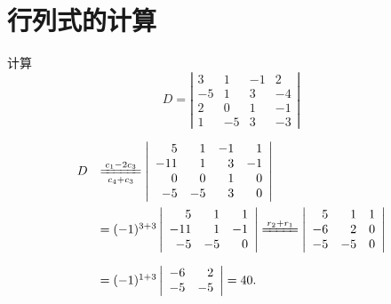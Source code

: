 \section{行列式的计算}
\begin{frame}

\begin{testexample}
  计算
  $$
  D = \left|
    \begin{array}{rrrr}
      3   &  1  &  -1  &  2 \\
      -5  &  1  &   3  & -4 \\
      2   &  0  &   1  & -1 \\
      1   & -5  &   3  &  -3 
    \end{array}
  \right|
  $$
\end{testexample} \pause
\begin{jie}
  $$
  \begin{array}{ll}
    D&  \xlongequal[c_4+c_3]{c_1-2c_3}  \left|
       \begin{array}{rrrr}
         5  & 1 & -1 & 1  \\
         -11 & 1 &  3 & -1 \\
         0 & 0 &  1 & 0 \\
         -5 & -5 & 3 & 0 
       \end{array}
                       \right|\\[0.8cm]
     & = (-1)^{3+3} \left| 
       \begin{array}{rrr}
         5 & 1 & 1\\
         -11 & 1 & -1 \\
         -5 & -5 & 0
       \end{array}
                   \right| 
                   \xlongequal{r_2+r_1}
                   \left|
                   \begin{array}{rrr}
                     5 & 1 & 1\\
                     -6 & 2 & 0 \\
                     -5 & -5 & 0
                   \end{array}
                               \right|\\[0.8cm]
     &  = (-1)^{1+3} \left|
       \begin{array}{rr}
         -6 &  2\\
         -5 & -5
       \end{array}
              \right| = 40.
  \end{array}
  $$    
\end{jie}
%
\end{frame}

